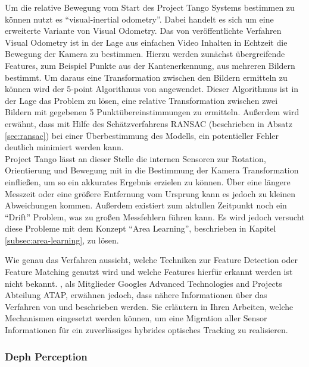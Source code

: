 Um die relative Bewegung vom Start des Project Tango Systems bestimmen zu können nutzt es \enquote{visual-inertial odometry}. \citep{GoogleDevelopersConcepts:online}
Dabei handelt es sich um eine erweiterte Variante von Visual Odometry. 
Das von \citet{nister2004visual} veröffentlichte Verfahren Visual Odometry ist in der Lage aus einfachen Video Inhalten in Echtzeit die Bewegung der Kamera zu bestimmen. 
Hierzu werden zunächst übergreifende Features, zum Beispiel Punkte aus der \citet{harris1988combined} Kantenerkennung, aus mehreren Bildern bestimmt. Um daraus eine Transformation zwischen den Bildern ermitteln zu können wird der 5-point Algorithmus von \citet{nister2004efficient} angewendet. Dieser Algorithmus ist in der Lage das Problem zu lösen, eine relative Transformation zwischen zwei Bildern mit gegebenen 5 Punktübereinstimmungen zu ermitteln. Außerdem wird erwähnt, dass mit Hilfe des Schätzverfahrens RANSAC (beschrieben in Absatz \ref{sec:ransac}) bei einer Überbestimmung des Modells, ein potentieller Fehler deutlich minimiert werden kann. \\

Project Tango lässt an dieser Stelle die internen Sensoren zur Rotation, Orientierung und Bewegung mit in die Bestimmung der Kamera Transformation einfließen, um so ein akkurates Ergebnis erzielen zu können. Über eine längere Messzeit oder eine größere Entfernung vom Ursprung kann es jedoch zu kleinen Abweichungen kommen. Außerdem existiert zum aktullen Zeitpunkt noch ein \enquote{Drift} Problem, was zu großen Messfehlern führen kann. Es wird jedoch versucht diese Probleme mit dem Konzept \enquote{Area Learning}, beschrieben in Kapitel \ref{subsec:area-learning}, zu lösen. \citep{GoogleDevelopersConcepts:online}

Wie genau das Verfahren aussieht, welche Techniken zur Feature Detection oder Feature Matching genutzt wird und welche Features hierfür erkannt werden ist nicht bekannt. \citet{Klingensmith_2015_7924}, als Mitglieder Googles Advanced Technologies and Projects Abteilung ATAP, erwähnen jedoch, dass nähere Informationen über das Verfahren von \citet{kottas2013consistency} und \citet{mourikis2007multi} beschrieben werden. Sie erläutern in Ihren Arbeiten, welche Mechanismen eingesetzt werden können, um eine Migration aller Sensor Informationen für ein zuverlässiges hybrides optisches Tracking zu realisieren.\\

\subsubsection{Deph Perception}

